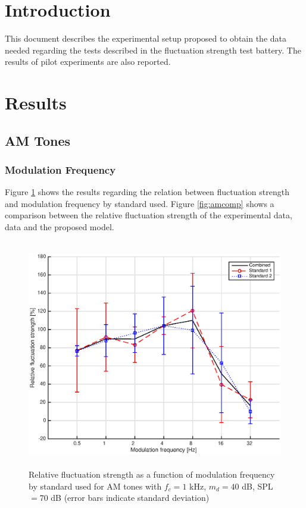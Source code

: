\documentclass[a4paper]{article}
\begin{document}

\section{Introduction}

This document describes the experimental setup proposed to obtain the data
needed regarding the tests described in the fluctuation strength test battery.
The results of pilot experiments are also reported.

\section{Results}

\subsection{AM Tones}

\subsubsection{Modulation Frequency}

Figure \ref{fig:amstds} shows the results regarding the relation between
fluctuation strength and modulation frequency by standard used. Figure
\ref{fig:amcomp} shows a comparison between the relative fluctuation strength
of the experimental data, \citeauthor{Fastl2007Psychoacoustics} data and the
proposed model.

\begin{figure}[ht!]
    \centering
    \includegraphics[height=10cm]{img/AM_tones-fm-results-All-standards}
    \caption{Relative fluctuation strength as a function of modulation
        frequency by standard used for AM tones with $f_c = 1$ kHz, $m_d = 40$
        dB, SPL $= 70$ dB (error bars indicate standard deviation)}
    \label{fig:amstds}
\end{figure}
\end{document}
